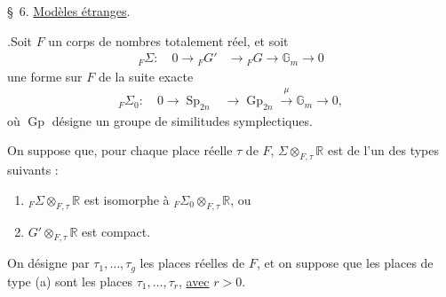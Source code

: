 \documentclass[10pt]{article}
\newcommand{\Gm}{\mathbb G_m}
\newcommand{\R}{\mathbb R}
\newcommand{\Gp}{\operatorname{Gp}}
\newcommand{\Sp}{\operatorname{Sp}}
\begin{document}
\noindent \S\ 6. \uline{Modèles étranges}.\par\vspace{0.9em}

.\quad Soit $F$ un corps de nombres totalement réel, et soit
\begingroup
\makeatletter
\tagsleft@true
\makeatother
\begin{align}
{}_F\Sigma:\quad 0\longrightarrow {}_FG'&\longrightarrow {}_FG
 \longrightarrow \Gm\longrightarrow0 \tag{6.1.1}
\end{align}
\endgroup
une forme sur $F$ de la suite exacte
\begingroup
\makeatletter
\tagsleft@true
\makeatother
\begin{align}
{}_F\Sigma_0:\quad 0\longrightarrow\Sp_{2n}&\longrightarrow\Gp_{2n}
 \xrightarrow{\ \mu\ }\Gm\longrightarrow0, \tag{6.1.2}
\end{align}
\endgroup
où $\Gp$ désigne un groupe de similitudes symplectiques.

On suppose que, pour chaque place réelle $\tau$ de $F$, $\Sigma\otimes_{F,\tau}\R$ est de l'un des types suivants :
\begin{enumerate}[label=(\alph*)]
\item ${}_F\Sigma\otimes_{F,\tau}\R$ est isomorphe à ${}_F\Sigma_0\otimes_{F,\tau}\R$, ou
\item $G'\otimes_{F,\tau}\R$ est compact.
\end{enumerate}
On désigne par $\tau_1,\ldots,\tau_g$ les places réelles de $F$, et on suppose que les places de type (a) sont les places $\tau_1,\ldots,\tau_r$, \uline{avec} $r>0$.
\end{document}
